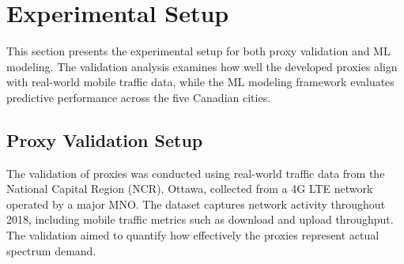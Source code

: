 \documentclass[conference]{IEEEtran}
\begin{document}


\section{Experimental Setup}
\label{sec:experimental_setup}

This section presents the experimental setup for both proxy validation and ML modeling. The validation analysis examines how well the developed proxies align with real-world mobile traffic data, while the ML modeling framework evaluates predictive performance across the five Canadian cities.

\subsection{Proxy Validation Setup}
The validation of proxies was conducted using real-world traffic data from the National Capital Region (NCR), Ottawa, collected from a 4G LTE network operated by a major MNO. The dataset captures network activity throughout 2018, including mobile traffic metrics such as download and upload throughput. The validation aimed to quantify how effectively the proxies represent actual spectrum demand.
\end{document}
